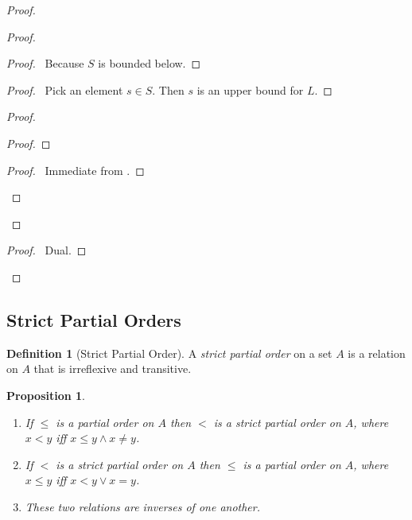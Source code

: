 \documentclass{book}
\let\qed\relax
\newtheorem{prop}[ax]{Proposition}
\theoremstyle{definition}
\newtheorem{df}[ax]{Definition}
\begin{document}
\begin{proof}
\pf
{}
\begin{proof}
	\begin{proof}
		\pf\ Because $S$ is bounded below.
	\end{proof}
	\begin{proof}
		\pf\ Pick an element $s \in S$. Then $s$ is an upper bound for $L$.
	\end{proof}
	\begin{proof}
		\begin{proof}
		\end{proof}
		\begin{proof}
			\pf\ Immediate from .
		\end{proof}
	\end{proof}
\end{proof}
\begin{proof}
	\pf\ Dual.
\end{proof}
\qed
\end{proof}

\subsection{Strict Partial Orders}

\begin{df}[Strict Partial Order]
A \emph{strict partial order} on a set $A$ is a relation on $A$ that is irreflexive and transitive.
\end{df}

\begin{prop}
\begin{enumerate}
\item If $\leq$ is a partial order on $A$ then $<$ is a strict partial order on $A$, where $x < y$ iff $x \leq y \wedge x \neq y$.
\item If $<$ is a strict partial order on $A$ then $\leq$ is a partial order on $A$, where $x \leq y$ iff $x < y \vee x = y$.
\item These two relations are inverses of one another.
\end{enumerate}
\end{prop}
\end{document}
